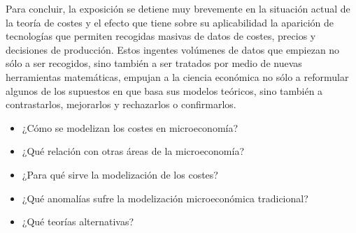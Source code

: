 \documentclass{nuevotema}
\begin{document}
Para concluir, la exposición se detiene muy brevemente en la situación actual de la teoría de costes y el efecto que tiene sobre su aplicabilidad la aparición de tecnologías que permiten recogidas masivas de datos de costes, precios y decisiones de producción. Estos ingentes volúmenes de datos que empiezan no sólo a ser recogidos, sino también a ser tratados por medio de nuevas herramientas matemáticas, empujan a la ciencia económica no sólo a reformular algunos de los supuestos en que basa sus modelos teóricos, sino también a contrastarlos, mejorarlos y rechazarlos o confirmarlos.


\begin{itemize}
	\item ¿Cómo se modelizan los costes en microeconomía?
	\item ¿Qué relación con otras áreas de la microeconomía?
	\item ¿Para qué sirve la modelización de los costes?
	\item ¿Qué anomalías sufre la modelización microeconómica tradicional?
	\item ¿Qué teorías alternativas?
\end{itemize}

\esquemacorto
\end{document}
